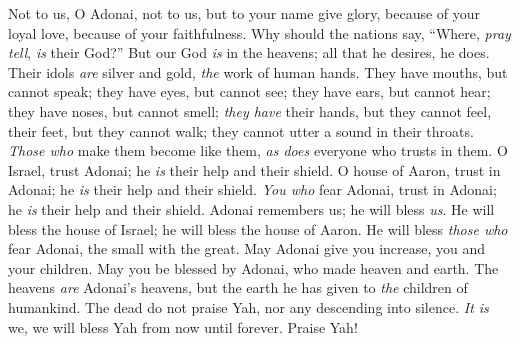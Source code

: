\begin{biblechapter} %
 Not to us, O Adonai, not to us, 
but to your name give glory, 
because of your loyal love, 
because of your faithfulness.
\verse Why should the nations say, 
“Where, \textit{pray tell}, \textit{is} their God?”
\verse But our God \textit{is} in the heavens; 
all that he desires, he does.
\verse Their idols \textit{are} silver and gold, 
\textit{the} work of human hands.
\verse They have mouths, but cannot speak; 
they have eyes, but cannot see;
\verse they have ears, but cannot hear; 
they have noses, but cannot smell;
\verse \textit{they have} their hands, but they cannot feel, 
their feet, but they cannot walk; 
they cannot utter a sound in their throats.
\verse \textit{Those who} make them become like them, 
\textit{as does} everyone who trusts in them.
\verse O Israel, trust Adonai; 
he \textit{is} their help and their shield.
\verse O house of Aaron, trust in Adonai; 
he \textit{is} their help and their shield.
\verse \textit{You who} fear Adonai, trust in Adonai; 
he \textit{is} their help and their shield.
\verse Adonai remembers us; he will bless \textit{us}. 
He will bless the house of Israel; 
he will bless the house of Aaron.
\verse He will bless \textit{those who} fear Adonai, 
the small with the great.
\verse May Adonai give you increase, 
you and your children.
\verse May you be blessed by Adonai, 
who made heaven and earth.
\verse The heavens \textit{are} Adonai’s heavens, 
but the earth he has given to \textit{the} children of humankind.
\verse The dead do not praise Yah, 
nor any descending into silence.
\verse \textit{It is} we, we will bless Yah 
from now until forever. 
Praise Yah!
\end{biblechapter}

